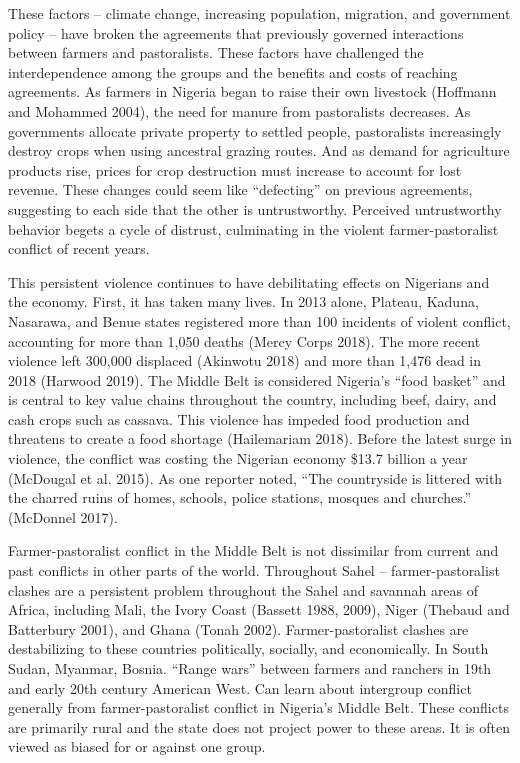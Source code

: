 \documentclass[11pt]{article}
\begin{document}
These factors -- climate change, increasing population, migration, and
government policy -- have broken the agreements that previously governed
interactions between farmers and pastoralists. These factors have
challenged the interdependence among the groups and the benefits and
costs of reaching agreements. As farmers in Nigeria began to raise their
own livestock (Hoffmann and Mohammed 2004), the need for manure from
pastoralists decreases. As governments allocate private property to
settled people, pastoralists increasingly destroy crops when using
ancestral grazing routes. And as demand for agriculture products rise,
prices for crop destruction must increase to account for lost revenue.
These changes could seem like ``defecting'' on previous agreements,
suggesting to each side that the other is untrustworthy. Perceived
untrustworthy behavior begets a cycle of distrust, culminating in the
violent farmer-pastoralist conflict of recent years.

This persistent violence continues to have debilitating effects on
Nigerians and the economy. First, it has taken many lives. In 2013
alone, Plateau, Kaduna, Nasarawa, and Benue states registered more than
100 incidents of violent conflict, accounting for more than 1,050 deaths
(Mercy Corps 2018). The more recent violence left 300,000 displaced
(Akinwotu 2018) and more than 1,476 dead in 2018 (Harwood 2019). The
Middle Belt is considered Nigeria's ``food basket'' and is central to
key value chains throughout the country, including beef, dairy, and cash
crops such as cassava. This violence has impeded food production and
threatens to create a food shortage (Hailemariam 2018). Before the
latest surge in violence, the conflict was costing the Nigerian economy
\$13.7 billion a year (McDougal et al. 2015). As one reporter noted,
``The countryside is littered with the charred ruins of homes, schools,
police stations, mosques and churches.'' (McDonnel 2017).

Farmer-pastoralist conflict in the Middle Belt is not dissimilar from
current and past conflicts in other parts of the world. Throughout Sahel
-- farmer-pastoralist clashes are a persistent problem throughout the
Sahel and savannah areas of Africa, including Mali, the Ivory Coast
(Bassett 1988, 2009), Niger (Thebaud and Batterbury 2001), and Ghana
(Tonah 2002). Farmer-pastoralist clashes are destabilizing to these
countries politically, socially, and economically. In South Sudan,
Myanmar, Bosnia. ``Range wars'' between farmers and ranchers in 19th and
early 20th century American West. Can learn about intergroup conflict
generally from farmer-pastoralist conflict in Nigeria's Middle Belt.
These conflicts are primarily rural and the state does not project power
to these areas. It is often viewed as biased for or against one group.
\end{document}

